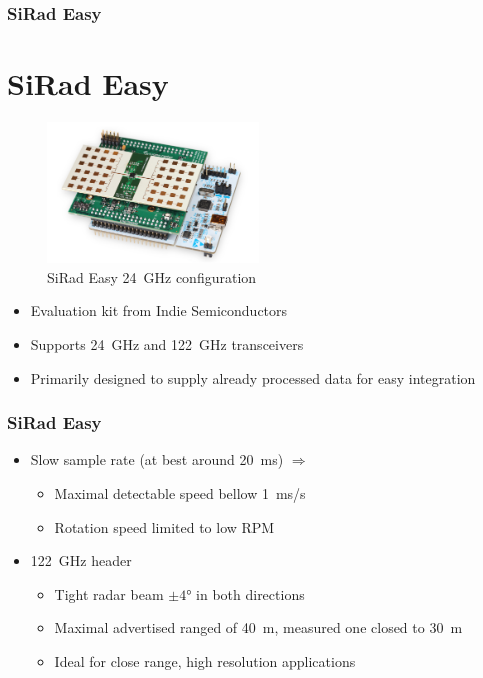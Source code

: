 \documentclass[aspectratio=43]{beamer}
\begin{document}
\begin{frame}[fragile]
  \frametitle{SiRad Easy}
  \section{SiRad Easy}

  \begin{figure}[h!]
    \centering
    \includegraphics[width=0.5\textwidth]{../img/sirad.png}

    \caption{SiRad Easy  24~GHz configuration }
    \label{fig:sirad}
  \end{figure}

  \begin{itemize}
    \item Evaluation kit from Indie Semiconductors
    \item Supports 24~GHz and 122~GHz transceivers
    \item Primarily designed to supply already processed data for easy integration
  \end{itemize}
\end{frame}

\begin{frame}[fragile]
  \frametitle{SiRad Easy}

  \begin{itemize}
    \item Slow sample rate (at best around 20~ms) $\Rightarrow$
			\begin{itemize}
				\item Maximal detectable speed bellow 1~ms/s
				\item Rotation speed limited to low RPM
			\end{itemize}
    \item 122~GHz header
      \begin{itemize}
        \item Tight radar beam $\pm 4$° in both directions
        \item Maximal advertised ranged of 40~m, measured one closed to 30~m
        \item Ideal for close range, high resolution applications
      \end{itemize}
  \end{itemize}
\end{frame}
\end{document}
